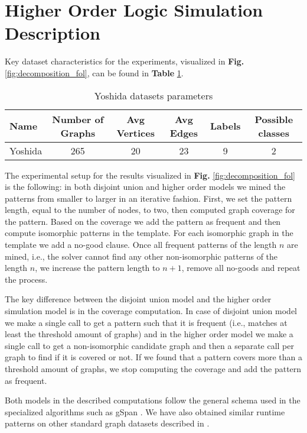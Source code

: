 \newpage
\appendix
\section{Higher Order Logic Simulation Description}
\label{sec:hol_description}
Key dataset characteristics for the experiments, visualized in \textbf{Fig.} \ref{fig:decomposition_fol}, can be found in \textbf{Table} \ref{table:yoshida}.
\begin{table}[thb]
  \caption{Yoshida datasets parameters}
  \label{table:yoshida}
  \begin{tabular}{l c c c c c}
    Name & Number of Graphs & Avg Vertices & Avg Edges & Labels & Possible classes\\
    \hline
    Yoshida & 265 & 20 &  23 &  9 & 2
  \end{tabular}
\end{table}

The experimental setup for the results visualized in \textbf{Fig.} \ref{fig:decomposition_fol} is the following: in both disjoint union and higher order models we mined the patterns from smaller to larger in an iterative fashion. First, we set the pattern length, equal to the number of nodes, to two, then computed graph coverage for the pattern. Based on the coverage we add the pattern as frequent and then compute isomorphic patterns in the template. For each isomorphic graph in the template we add a no-good clause. Once all frequent patterns of the length $n$ are mined, i.e., the solver cannot find any other non-isomorphic patterns of the length $n$, we increase the pattern length to $n+1$, remove all no-goods and repeat the process.

The key difference between the disjoint union model and the higher order simulation model is in the coverage computation. In case of disjoint union model we make a single call to get a pattern such that it is frequent (i.e., matches at least the threshold amount of graphs) and in the higher order model we make a single call to get a non-isomorphic candidate graph and then a separate call per graph to find if it is covered or not. If we found that a pattern covers more than a threshold amount of graphs, we stop computing the coverage and add the pattern as frequent.

Both models in the described computations follow the general schema used in the specialized algorithms such as gSpan \citep{gspan}. We have also obtained similar runtime patterns on other standard graph datasets described in \citep{ilp_graph_mining}.


